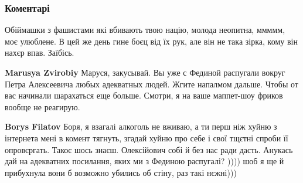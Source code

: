  
 
 
 
 
\subsubsection{Коментарі}
\label{sec:09_08_2021.fb.filatov_boris.1.devochka_maguchih.cmt}

\begin{itemize}


Обіймашки з фашистами які вбивають твою націю, молода неопитна, ммммм, моє
улюблене. В цей же день гине боєц від їх рук, але він не така зірка, кому він
нахєр впав. Заїбісь.

\begin{itemize}

 
\textbf{Marusya Zvirobiy} Маруся, закусывай.
Вы уже с Фединой распугали вокруг Петра Алексеевича любых адекватных людей.
Жгите напалмом дальше.
Чтобы от вас начинали шарахаться еще больше.
Смотри, я на ваше маппет-шоу фриков вообще не реагирую.

 

\textbf{Borys Filatov} Боря, я взагалі алкоголь не вживаю, а ти перш ніж хуйню з інтернета мені в комент тягнуть, згадай хуйню про себе і свої тщєтні спроби її опровєргать. Такоє шось знаєш. Олексійович собі й без нас ради дасть. Анукась дай на адекватних посилання, яких ми з Фединою распугалі? )))) шоб я ще й прибухнула вони б возможно убились об стіну, раз такі нєжні)))



\end{itemize}
\end{itemize}
